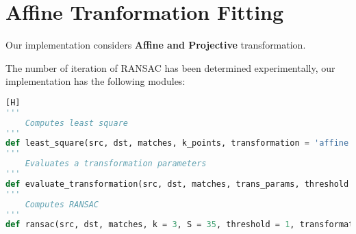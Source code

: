 \section{Affine Tranformation Fitting}

Our implementation considers \textbf{Affine and Projective} transformation.

The number of iteration of RANSAC has been determined experimentally, our implementation has the following modules:

\begin{lstlisting}[language=python][H]
'''
    Computes least square
'''
def least_square(src, dst, matches, k_points, transformation = 'affine'):
'''
    Evaluates a transformation parameters
'''
def evaluate_transformation(src, dst, matches, trans_params, threshold = 1, transformation = 'affine'):
'''
    Computes RANSAC
'''
def ransac(src, dst, matches, k = 3, S = 35, threshold = 1, transformation = 'affine'):
\end{lstlisting}


